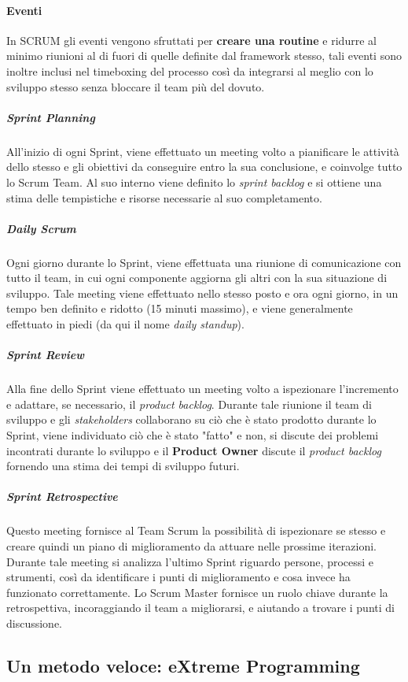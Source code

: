 \documentclass[a4paper,12pt]{report}
\begin{document}
				\paragraph{Eventi}
				In SCRUM gli eventi vengono sfruttati per \textbf{creare una routine} e ridurre al minimo riunioni al di fuori di quelle definite dal framework stesso, tali eventi sono inoltre inclusi nel timeboxing del processo così da integrarsi al meglio con lo sviluppo stesso senza bloccare il team più del dovuto.
				
					\subparagraph{Sprint Planning}
					All'inizio di ogni Sprint, viene effettuato un meeting volto a pianificare le attività dello stesso e gli obiettivi da conseguire entro la sua conclusione, e coinvolge tutto lo Scrum Team. Al suo interno viene definito lo \emph{sprint backlog} e si ottiene una stima delle tempistiche e risorse necessarie al suo completamento.
					
					\subparagraph{Daily Scrum}
					Ogni giorno durante lo Sprint, viene effettuata una riunione di comunicazione con tutto il team, in cui ogni componente aggiorna gli altri con la sua situazione di sviluppo. Tale meeting viene effettuato nello stesso posto e ora ogni giorno, in un tempo ben definito e ridotto (15 minuti massimo), e viene generalmente effettuato in piedi (da qui il nome \emph{daily standup}).
					
					\subparagraph{Sprint Review}
					Alla fine dello Sprint viene effettuato un meeting volto a ispezionare l'incremento e adattare, se necessario, il \emph{product backlog}. Durante tale riunione il team di sviluppo e gli \emph{stakeholders} collaborano su
					ciò che è stato prodotto durante lo Sprint, viene individuato ciò che è stato "fatto" e non, si discute dei problemi incontrati durante lo sviluppo e il \textbf{Product Owner} discute il \emph{product backlog} fornendo una stima dei tempi di sviluppo futuri.
					
					\subparagraph{Sprint Retrospective}
					Questo meeting fornisce al Team Scrum la possibilità di ispezionare se stesso e creare quindi un piano di miglioramento da attuare nelle prossime iterazioni. Durante tale meeting si analizza l'ultimo Sprint riguardo persone, processi e strumenti, così da identificare i punti di miglioramento e cosa invece ha funzionato correttamente. Lo Scrum Master fornisce un ruolo chiave durante la retrospettiva, incoraggiando il team a migliorarsi, e aiutando a trovare i punti di discussione.
							
			\subsection{Un metodo veloce: eXtreme Programming}
			
\end{document}
